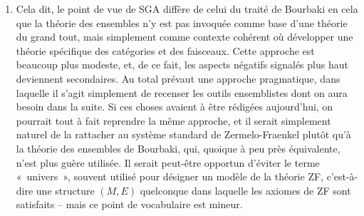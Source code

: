 \documentclass[10pt]{fichiers-configuration-latex/smfart}
\begin{document}
\begin{enumerate}
prochaine du problème du continu. On ne saurait donc trop
insister sur le fait que l'axiome « il existe un ensemble
infini » n'est pas juste un petit axiome supplémentaire, mais
est l'axiome essentiel, et, en particulier, qu'il ne saurait
être déduit des autres axiomes comme le démontre par exemple
le second théorème d'incomplétude de Gödel puisqu'en
montrant l'existence de l'ensemble $U_1$ la théorie des
ensembles prouve la non-contradiction de l'arithmétique.
L'un des aspects les plus regrettables dans l'approche
algébrique de la théorie des ensembles est d'induire le
sentiment erroné que la théorie des ensembles n'est qu'une
sorte de prolongement infini plus ou moins trivial de la
théorie des ensembles finis, masquant ainsi les problèmes
véritables et suscitant de ce fait un compréhensible
désintérêt pour tous les développements ultérieurs.

\item Cela dit, le point de vue de SGA diffère de celui du
traité de Bourbaki en cela que la théorie des ensembles n'y
est pas invoquée comme base d'une théorie du grand tout,
mais simplement comme contexte cohérent où développer une
théorie spécifique des catégories et des faisceaux. Cette
approche est beaucoup plus modeste, et, de ce fait, les
aspects négatifs signalés plus haut deviennent secondaires.
Au total prévaut une approche pragmatique, dans laquelle il
s'agit simplement de recenser les outils ensemblistes dont
on aura besoin dans la suite.
Si ces choses avaient à être rédigées aujourd'hui, on
pourrait tout à fait reprendre la même approche, et il
serait simplement naturel de la rattacher au système
standard de Zermelo-Fraenkel plutôt qu'à la théorie des
ensembles de Bourbaki, qui, quoique à peu près équivalente,
n'est plus guère utilisée. Il serait peut-être opportun
d'éviter le terme « univers », souvent utilisé pour désigner
un modèle de la théorie ZF, c'est-à-dire une structure
$(M,E)$ quelconque dans laquelle les axiomes de ZF sont
satisfaits -- mais ce point de vocabulaire est mineur.


\end{enumerate}
\end{document}
